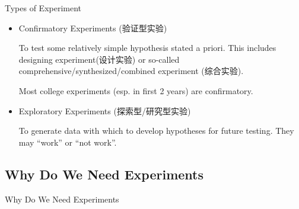 \documentclass[14pt,t]{beamer}
\begin{document}
\begin{frame}{Types of Experiment}
\begin{itemize}
    \item Confirmatory Experiments (验证型实验)

        To test some relatively simple hypothesis stated a priori.
        This includes designing experiment(设计实验) or so-called
        comprehensive/synthesized/combined experiment (综合实验).

        Most college experiments (esp. in first 2 years) are confirmatory.
    \item<2-> Exploratory Experiments (探索型/研究型实验)

        To generate data with which to develop hypotheses for future
        testing. They may ``\alert{work}'' or ``\alert{not work}''.
\end{itemize}
\end{frame}

\subsection{Why Do We Need Experiments}
\begin{frame}{Why Do We Need Experiments}
\end{frame}

\iffalse
\begin{frame}{QUIZ-2}
    When choose Other, please specify.
\small
\begin{itemize}
    \item 你需要研究在海拔4000米的青藏高原上水的沸点, 这个实验属于:
        
        A.验证型实验.  B.研究型实验.
    \item 当某项条件影响结果时, 应尽量发挥它的作用, 以便结果更符合预期.
        (T/F/O)
    \item 在一个研究型实验中, 如果实验结果与预期不符, 则实验结果不宜公开.
        (T/F/O)
    \item 你如何理解``实验结果''和``结论''之间的关系?

        A. 客观/主观. B. 定量/定性. C. Both. D. Neither.
\end{itemize}
\end{frame}
\fi
\end{document}
